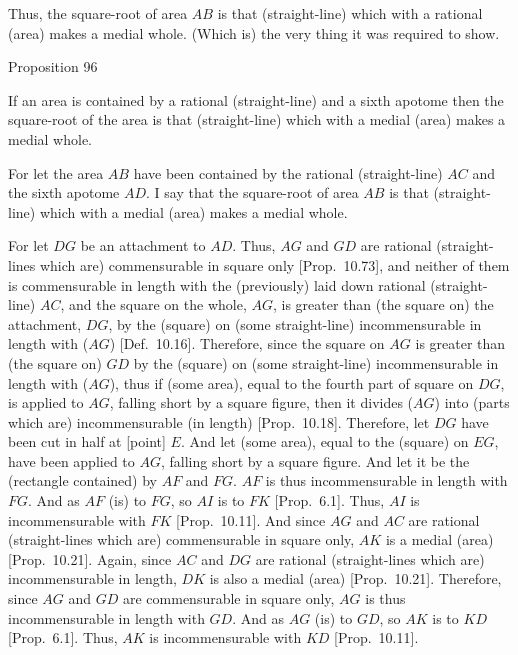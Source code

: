 Thus, the square-root of area $AB$ is that (straight-line) which with a rational (area) makes a medial whole. (Which is) the very thing it was required to show.


\begin{center}
{\large Proposition 96}
\end{center}

If an area is contained by a rational (straight-line)
and a sixth apotome then the square-root of the area is that (straight-line) which with a medial (area) makes a medial whole.

\epsfysize=1.3in
\centerline{}

For let the area $AB$ have been contained by the rational (straight-line)
$AC$ and the sixth apotome $AD$. I say that the square-root of area $AB$
is  that (straight-line) which with a medial (area) makes a medial whole.

For let $DG$ be an attachment to $AD$. Thus, $AG$ and $GD$ are rational (straight-lines which are) commensurable in square only [Prop.~10.73], and neither of them is
commensurable in length with the (previously) laid down rational (straight-line) $AC$, and the square on the whole, $AG$, is greater than (the square on)
the attachment, $DG$, by the (square) on (some straight-line)
incommensurable in length with ($AG$) [Def.~10.16]. Therefore, since the square on $AG$
is greater than (the square on) $GD$ by the (square) on (some straight-line)
incommensurable in length with ($AG$), thus if (some area), equal to
the fourth part of square on $DG$, is applied to $AG$, falling short
by a square figure, then it divides ($AG$) into (parts which are) incommensurable
(in length) [Prop.~10.18]. Therefore, let $DG$ have been cut in  half at [point] $E$. And let (some area), equal to the
(square) on $EG$, have been applied to $AG$, falling short by a square figure.
And let it be the (rectangle contained) by $AF$ and $FG$. $AF$ is
thus incommensurable in length with $FG$. And as $AF$ (is) to $FG$,
so $AI$ is to $FK$ [Prop.~6.1].  Thus, $AI$
is incommensurable with $FK$ [Prop.~10.11]. 
And since $AG$ and $AC$ are rational (straight-lines which are)
commensurable in square only, $AK$ is a medial (area) [Prop.~10.21]. Again, since $AC$ and $DG$
are rational (straight-lines which are) incommensurable in length, $DK$
is also a medial (area) [Prop.~10.21]. Therefore,
since $AG$ and $GD$ are commensurable in square only,  $AG$
is thus incommensurable in length with $GD$. And as $AG$ (is) to $GD$,
so $AK$ is to $KD$ [Prop.~6.1]. Thus, $AK$
is incommensurable with $KD$ [Prop.~10.11].

